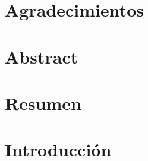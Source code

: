\documentclass[12pt]{book}
\begin{document}
	\frontmatter
	\chapter*{Agradecimientos}
 	\chapter*{Abstract}
      
	\chapter*{Resumen}
         
	\tableofcontents
	\listoffigures
	\listoftables
	\mainmatter
	\chapter{Introducción}
\end{document}
